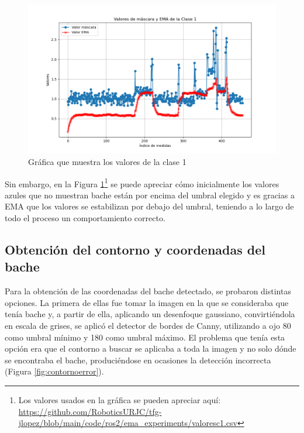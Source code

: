 \begin{figure} [h!]
	\begin{center}
		\includegraphics[width=15cm]{figs/cap7/GraficaC1.png}
	\end{center}
	\caption{Gráfica que muestra los valores de la clase 1}
	\label{fig:diagramaemac1}
\end{figure}

Sin embargo, en la Figura \ref{fig:diagramaemac1}\footnote{Los valores usados en la gráfica se pueden apreciar aquí: \url{https://github.com/RoboticsURJC/tfg-jlopez/blob/main/code/ros2/ema_experiments/valoresc1.csv}} se puede apreciar cómo inicialmente los valores azules que no muestran bache están por encima del umbral elegido y es gracias a EMA que los valores se estabilizan por debajo del umbral, teniendo a lo largo de todo el proceso un comportamiento correcto. 

\subsection{Obtención del contorno y coordenadas del bache}
\label{subsec:expcontorno}

Para la obtención de las coordenadas del bache detectado, se probaron distintas opciones. La primera de ellas fue tomar la imagen en la que se consideraba que tenía bache y, a partir de ella, aplicando un desenfoque gaussiano, convirtiéndola en escala de grises, se aplicó el detector de bordes de Canny, utilizando a ojo 80 como umbral mínimo y 180 como umbral máximo. El problema que tenía esta opción era que el contorno a buscar se aplicaba a toda la imagen y no solo dónde se encontraba el bache, produciéndose en ocasiones la detección incorrecta (Figura \ref{fig:contornoerror}).

